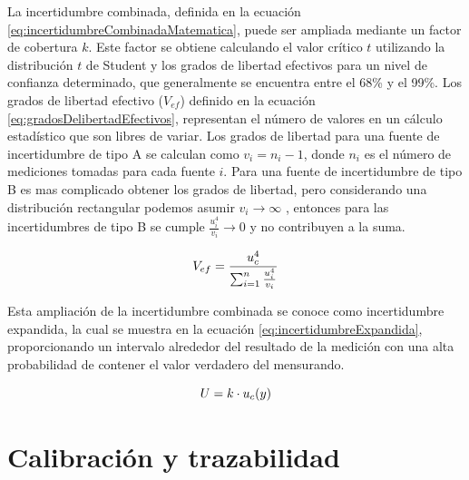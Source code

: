 La incertidumbre combinada, definida en la ecuación \ref{eq:incertidumbreCombinadaMatematica}, puede ser ampliada mediante un factor de cobertura $k$. Este factor se obtiene calculando el valor crítico $t$ utilizando la distribución $t$ de Student y los grados de libertad efectivos para un nivel de confianza determinado, que generalmente se encuentra entre el 68\% y el 99\%. Los grados de libertad efectivo ($V_{ef}$) definido en la ecuación \ref{eq:gradosDelibertadEfectivos}, representan el número de valores en un cálculo estadístico que son libres de variar. Los grados de libertad para una fuente de incertidumbre de tipo A se calculan como  $v_{i}= n_{i}-1$, donde $n_{i}$ es el número de mediciones tomadas para cada fuente $i$. Para una fuente de incertidumbre de tipo B es mas complicado obtener los grados de libertad, pero considerando una distribución rectangular podemos asumir $v_{i} \rightarrow \infty$ \cite{Workshop_WMO2021}, entonces para las incertidumbres de tipo B se cumple $\frac{u_i^4}{v_i} \rightarrow 0 $ y no contribuyen a la suma.


\begin{equation}
    \centering
    V_{ef} = \frac{u_c^4}{\sum_{i=1}^{n} \frac{u_i^4}{v_i}}
    \label{eq:gradosDelibertadEfectivos}
\end{equation}

\vspace{3mm}
Esta ampliación de la incertidumbre combinada se conoce como incertidumbre expandida, la cual se muestra en la ecuación \ref{eq:incertidumbreExpandida}, proporcionando un intervalo alrededor del resultado de la medición con una alta probabilidad de contener el valor verdadero del mensurando.


\begin{equation}
    \centering
    U = k \cdot u_{c}(y)
    \label{eq:incertidumbreExpandida}
\end{equation}

\section{Calibración y trazabilidad}\label{sec:trazabilidad}

